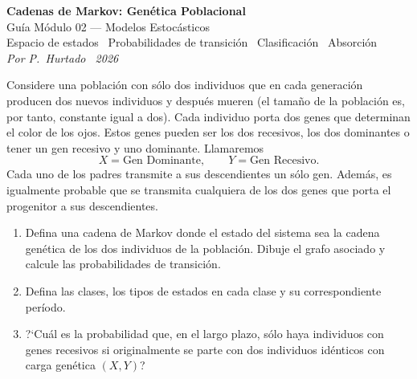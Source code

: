 \documentclass[10pt,a4paper]{article}
\newenvironment{enunciado}[1]{%
  \begin{tcolorbox}[
    breakable,
    colback=sectionbg!8, colframe=sectionbg,
    boxrule=0.8pt, arc=3pt, left=8pt, right=8pt, top=6pt, bottom=6pt,
    fonttitle=\normalsize\bfseries\sffamily, coltitle=white, colbacktitle=sectionbg, titlerule=0pt,
    title={#1},
  ]%
}{\end{tcolorbox}}
\begin{document}

\begin{tcolorbox}[
    colback=sectionbg, colupper=white, colframe=sectionbg,
    sharp corners, left=12pt, right=12pt, top=10pt, bottom=10pt,
  ]
  {\Large\bfseries\sffamily Cadenas de Markov: Gen\'etica Poblacional}\\[4pt]
  {\normalsize\sffamily Gu\'ia M\'odulo 02 --- Modelos Estoc\'asticos}\\[6pt]
  {\small\sffamily\color{white!80!sectionbg}
    Espacio de estados \textperiodcentered\ Probabilidades de transici\'on
    \textperiodcentered\ Clasificaci\'on \textperiodcentered\ Absorci\'on}\\[6pt]
  {\footnotesize\sffamily\color{white!85!sectionbg}\itshape
    Por P.~Hurtado \textperiodcentered\ 2026}
\end{tcolorbox}

\vspace{6pt}

\begin{enunciado}{Problema 1 \textperiodcentered\ Modelo de Wright--Fisher (2 individuos)}
  Considere una poblaci\'on con s\'olo dos individuos que en cada generaci\'on producen
  dos nuevos individuos y despu\'es mueren (el tama\~no de la poblaci\'on es, por tanto,
  constante igual a dos). Cada individuo porta dos genes que determinan el color de
  los ojos. Estos genes pueden ser los dos recesivos, los dos dominantes o tener un
  gen recesivo y uno dominante. Llamaremos
  \[
    X = \text{Gen Dominante}, \qquad Y = \text{Gen Recesivo.}
  \]
  Cada uno de los padres transmite a sus descendientes un s\'olo gen. Adem\'as, es
  igualmente probable que se transmita cualquiera de los dos genes que porta el
  progenitor a sus descendientes.

  \smallskip
  \begin{enumerate}[label=\alph*)]
    \item Defina una cadena de Markov donde el estado del sistema sea la cadena
          gen\'etica de los dos individuos de la poblaci\'on. Dibuje el grafo asociado
          y calcule las probabilidades de transici\'on.
    \item Defina las clases, los tipos de estados en cada clase y su correspondiente
          per\'iodo.
    \item ?`Cu\'al es la probabilidad que, en el largo plazo, s\'olo haya individuos
          con genes recesivos si originalmente se parte con dos individuos id\'enticos
          con carga gen\'etica $(X,Y)$?
  \end{enumerate}
\end{enunciado}
\end{document}
